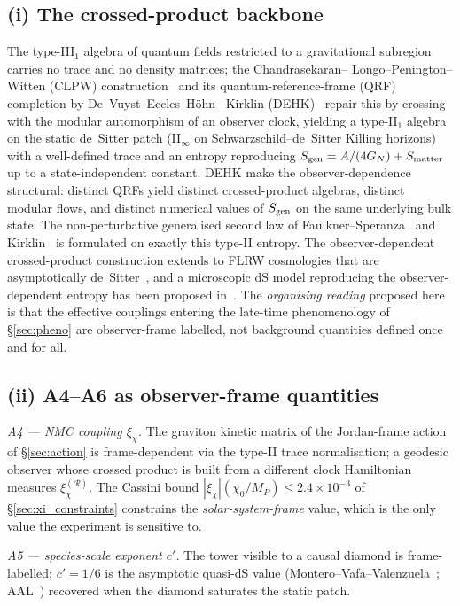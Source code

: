 \documentclass[epjc3,twocolumn]{svjour3}
\begin{document}
\subsection*{(i) The crossed-product backbone}

The type-III$_1$ algebra of quantum fields restricted to a gravitational
subregion carries no trace and no density matrices; the Chandrasekaran--
Longo--Penington--Witten (CLPW) construction~\cite{CLPW2023} and its
quantum-reference-frame (QRF) completion by De~Vuyst--Eccles--H\"ohn--
Kirklin (DEHK)~\cite{DEHK2025a,DEHK2025b} repair this by crossing with the
modular automorphism of an observer clock, yielding a type-II$_1$ algebra on
the static de~Sitter patch (II$_\infty$ on Schwarzschild--de~Sitter
Killing horizons) with a well-defined trace and an entropy reproducing
$S_{\rm gen} = A/(4G_N) + S_{\rm matter}$ up to a state-independent
constant. DEHK make the observer-dependence structural: distinct QRFs
yield distinct crossed-product algebras, distinct modular flows, and
distinct numerical values of $S_{\rm gen}$ on the same underlying bulk
state. The non-perturbative generalised second law of
Faulkner--Speranza~\cite{FaulknerSperanza2024} and
Kirklin~\cite{Kirklin2025} is formulated on exactly this type-II entropy.
The observer-dependent crossed-product construction extends to FLRW
cosmologies that are asymptotically de~Sitter~\cite{KFLS2024}, and a
microscopic dS model reproducing the observer-dependent entropy has been
proposed in~\cite{TiettoVerlinde2025}. The \emph{organising reading}
proposed here is that the effective couplings entering the late-time
phenomenology of \S\ref{sec:pheno} are observer-frame labelled, not
background quantities defined once and for all.

\subsection*{(ii) A4--A6 as observer-frame quantities}

\emph{A4 --- NMC coupling $\xi_\chi$.} The graviton kinetic matrix of the
Jordan-frame action of \S\ref{sec:action} is frame-dependent via the type-II trace
normalisation; a geodesic observer whose crossed product is built from a
different clock Hamiltonian measures $\xi_\chi^{(\mathcal R)}$. The
Cassini bound $|\xi_\chi|(\chi_0/M_P)\le 2.4\times 10^{-3}$ of
\S\ref{sec:xi_constraints} constrains the \emph{solar-system-frame} value,
which is the only value the experiment is sensitive to.

\emph{A5 --- species-scale exponent $c'$.} The tower visible to a causal
diamond is frame-labelled; $c' = 1/6$ is the asymptotic quasi-dS value
(Montero--Vafa--Valenzuela~\cite{Montero2022}; AAL~\cite{AAL2023})
recovered when the diamond saturates the static patch.
\end{document}
